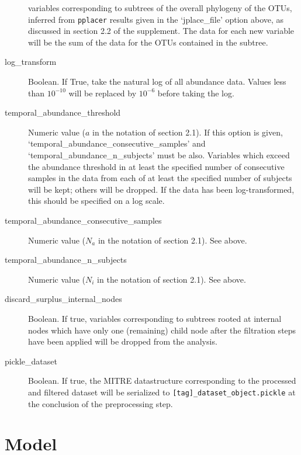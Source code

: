 \documentclass[12pt]{report}
\begin{document}
\begin{description}
  variables corresponding to subtrees of the overall phylogeny of the
  OTUs, inferred from \texttt{pplacer} results given in the
  `jplace\_file' option above, as discussed in section 2.2 of the
  supplement. The data for each new variable will be the sum of the data
  for the OTUs contained in the subtree.
\item[log\_transform] Boolean. If True, take the natural log of all
  abundance data. Values less than $10^{-10}$ will be replaced by
  $10^{-6}$ before taking the log.
\item[temporal\_abundance\_threshold] Numeric value ($a$ in the
  notation of section 2.1).  If this option is given,
  `temporal\_abundance\_consecutive\_samples' and
  `temporal\_abundance\_n\_subjects' must be also. Variables which
  exceed the abundance threshold in at least the specified number of
  consecutive samples in the data from each of at least the specified
  number of subjects will be kept; others will be dropped. If the data
  has been log-transformed, this should be specified on a log scale.
\item[temporal\_abundance\_consecutive\_samples] Numeric value ($N_a$
  in the notation of section 2.1). See above.
\item[temporal\_abundance\_n\_subjects] Numeric value ($N_i$ in the
  notation of section 2.1). See above.
\item[discard\_surplus\_internal\_nodes] Boolean. If true,
  variables corresponding to subtrees rooted at internal nodes which
  have only one (remaining) child node after the filtration steps
  have been applied will be dropped from the analysis.
\item[pickle\_dataset] Boolean. If true, the MITRE datastructure
  corresponding to the processed and filtered dataset will be
  serialized to \texttt{[tag]\_dataset\_object.pickle} at the
  conclusion of the preprocessing step.
\end{description}

\section{Model}\label{model}
\end{document}
